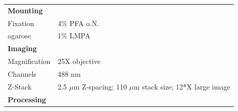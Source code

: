 \documentclass[11pt,singlespacinge,twoside]{reedthesis} %
\begin{document}
\begin{longtable}[]{@{}ll@{}}
\begin{minipage}[t]{0.21\columnwidth}\raggedright
\textbf{Mounting}\strut
\end{minipage} & \begin{minipage}[t]{0.73\columnwidth}\raggedright
\strut
\end{minipage}\tabularnewline
\begin{minipage}[t]{0.21\columnwidth}\raggedright
Fixation\strut
\end{minipage} & \begin{minipage}[t]{0.73\columnwidth}\raggedright
4\% PFA o.N.\strut
\end{minipage}\tabularnewline
\begin{minipage}[t]{0.21\columnwidth}\raggedright
agarose\strut
\end{minipage} & \begin{minipage}[t]{0.73\columnwidth}\raggedright
1\% LMPA\strut
\end{minipage}\tabularnewline
\begin{minipage}[t]{0.21\columnwidth}\raggedright
\textbf{Imaging}\strut
\end{minipage} & \begin{minipage}[t]{0.73\columnwidth}\raggedright
\strut
\end{minipage}\tabularnewline
\begin{minipage}[t]{0.21\columnwidth}\raggedright
Magnification\strut
\end{minipage} & \begin{minipage}[t]{0.73\columnwidth}\raggedright
25X objective\strut
\end{minipage}\tabularnewline
\begin{minipage}[t]{0.21\columnwidth}\raggedright
Channels\strut
\end{minipage} & \begin{minipage}[t]{0.73\columnwidth}\raggedright
488 nm\strut
\end{minipage}\tabularnewline
\begin{minipage}[t]{0.21\columnwidth}\raggedright
Z-Stack\strut
\end{minipage} & \begin{minipage}[t]{0.73\columnwidth}\raggedright
2.5 \(\mu\)m Z-spacing; 110 \(\mu\)m stack size; 12*X large image\strut
\end{minipage}\tabularnewline
\begin{minipage}[t]{0.21\columnwidth}\raggedright
\textbf{Processing}\strut
\end{minipage} & \begin{minipage}[t]{0.73\columnwidth}\raggedright

\end{minipage}
\end{longtable}
\end{document}
